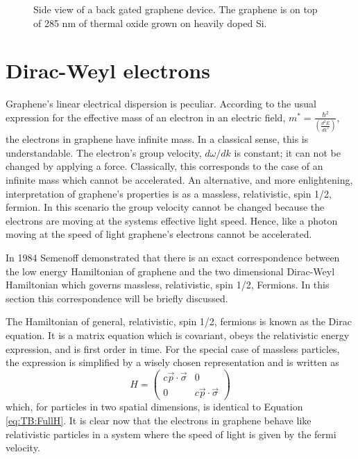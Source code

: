 \begin{figure}
	\begin{center}
	
	\end{center}
	\caption[Side view of a back gated graphene device.]{\label{fig:TB:FET} Side view of a back gated graphene device.  The graphene is on top of 285 nm of thermal oxide grown on heavily doped Si. }	
\end{figure}

\section{Dirac-Weyl electrons}
Graphene's linear electrical dispersion is peculiar.
According to the usual expression for the effective mass of an electron in an electric field, $m^*=\frac{\hbar^2}{\left(\frac{d^2 E}{d k^2}\right)}$, \cite{Kittel2005} the electrons in graphene have infinite mass.
In a classical sense, this is understandable.
The electron's group velocity, $d \omega/d k$ is constant; it can not be changed by applying a force.
Classically, this corresponds to the case of an infinite mass which cannot be accelerated.
An alternative, and more enlightening, interpretation of graphene's properties is as a massless, relativistic, spin 1/2, fermion.
In this scenario the group velocity cannot be changed because the electrons are moving at the systems effective light speed.
Hence, like a photon moving at the speed of light graphene's electrons cannot be accelerated.

In 1984 Semenoff demonstrated that there is an exact correspondence between the low energy Hamiltonian of graphene and the two dimensional Dirac-Weyl Hamiltonian \cite{Semenoff1984} which governs massless, relativistic, spin 1/2, Fermions.
In this section this correspondence will be briefly discussed.

The Hamiltonian of general, relativistic, spin 1/2, fermions is known as the Dirac equation.
It is a matrix equation which is covariant, obeys the relativistic energy expression, and is first order in time.
For the special case of massless particles, the expression is simplified by a wisely chosen representation and is written as
\begin{equation*}
	H=\left( \begin{array}{cc}
			c \vec{p} \cdot \vec{\sigma}              & 0\\
			0              & c \vec{p} \cdot \vec{\sigma}			   	            			\end{array} \right)
\end{equation*}
which, for particles in two spatial dimensions, is identical to Equation \ref{eq:TB:FullH}.
It is clear now that the electrons in graphene behave like relativistic particles in a system where the speed of light is given by the fermi velocity.

